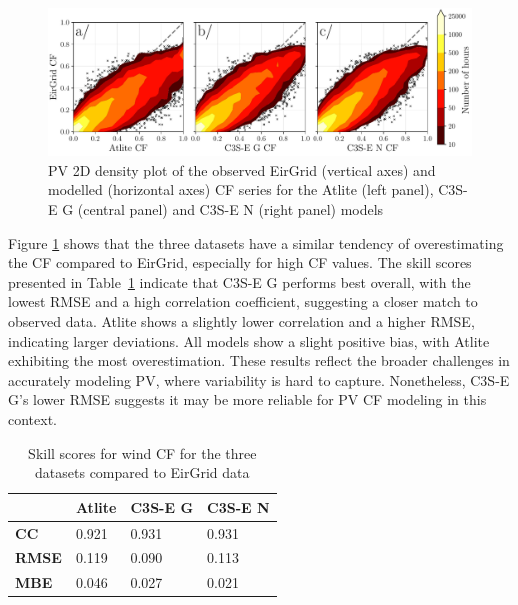 \documentclass[a4paper, 11pt]{article}
\begin{document}
\begin{figure}[h!]
	\centering
	\includegraphics[width=\textwidth]{verification_pv_contour}
	\caption{PV 2D density plot of the observed EirGrid (vertical axes) and modelled (horizontal axes) CF series for the Atlite  (left panel), C3S-E G (central panel) and C3S-E N (right panel) models}	
	\label{fig:solar_verification_contour}
\end{figure}

Figure \ref{fig:solar_verification_contour} shows that the three datasets have a similar tendency of overestimating the CF compared to EirGrid, especially for high CF values. The skill scores presented in Table~\ref{tab:pv_skill_scores} indicate that C3S-E G performs best overall, with the lowest RMSE and a high correlation coefficient, suggesting a closer match to observed data. Atlite shows a slightly lower correlation and a higher RMSE, indicating larger deviations. All models show a slight positive bias, with Atlite exhibiting the most overestimation. These results reflect the broader challenges in accurately modeling PV, where variability is hard to capture. Nonetheless, C3S-E G’s lower RMSE suggests it may be more reliable for PV CF modeling in this context.

\begin{table}[!ht]
	\centering
	\begin{tabular}{l|lll|}
	\cline{2-4}
	& \textbf{Atlite} & \textbf{C3S-E G} & \textbf{C3S-E N} \\ \hline
	\multicolumn{1}{|l|}{\textbf{CC}}   & 0.921           & 0.931            & 0.931            \\ \hline
	\multicolumn{1}{|l|}{\textbf{RMSE}} & 0.119           & 0.090            & 0.113            \\ \hline
	\multicolumn{1}{|l|}{\textbf{MBE}}   & 0.046           & 0.027           & 0.021           \\ \hline
	\end{tabular}
	\caption{Skill scores for wind CF for the three datasets compared to EirGrid data}
	\label{tab:pv_skill_scores}
\end{table}
\end{document}
